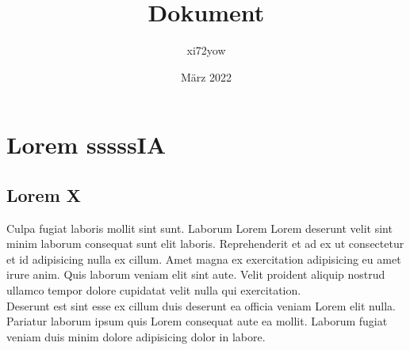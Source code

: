 \documentclass{scrreprt}
\title{Dokument}
\author{xi72yow}
\date{März 2022}
\begin{document}

\begin{titlepage}
	\maketitle
\end{titlepage}

\tableofcontents
\newpage

\chapter{Lorem sssssIA}

\section{Lorem X\cite{RPOI2003}}
Culpa fugiat laboris mollit sint sunt. Laborum Lorem Lorem deserunt velit sint minim laborum consequat sunt elit laboris. Reprehenderit et ad ex ut consectetur et id adipisicing nulla ex cillum. Amet magna ex exercitation adipisicing eu amet irure anim. Quis laborum veniam elit sint aute. Velit proident aliquip nostrud ullamco tempor dolore cupidatat velit nulla qui exercitation. \\

Deserunt est sint esse ex cillum duis deserunt ea officia veniam Lorem elit nulla. Pariatur laborum ipsum quis Lorem consequat aute ea mollit. Laborum fugiat veniam duis minim dolore adipisicing dolor in labore.
\end{document}
